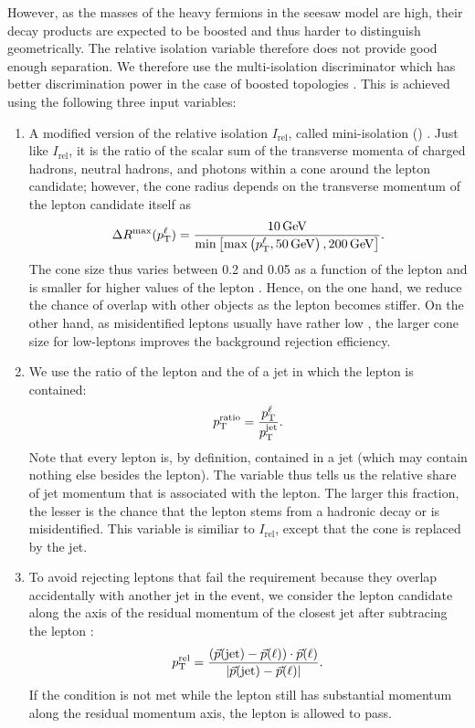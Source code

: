 However, as the masses of the heavy fermions in the seesaw model are high, their decay products are expected to be boosted and thus harder to distinguish geometrically. The relative isolation variable therefore does not provide good enough separation. We therefore use the multi-isolation discriminator which has better discrimination power in the case of boosted topologies \cite{CMS-PAS-SUS-15-008}. This is achieved using the following three input variables:

\begin{enumerate}
	\item A modified version of the relative isolation $I_\textrm{rel}$, called mini-isolation (\miniIso) \cite{Rehermann:2010vq}. Just like $I_\textrm{rel}$, it is the ratio of the scalar sum of the transverse momenta of charged hadrons, neutral hadrons, and photons within a cone around the lepton candidate; however, the cone radius depends on the transverse momentum of the lepton candidate itself as
		\begin{equation}
			\Delta R^\textrm{max}(p_{\mathrm{T}}^\ell) = \dfrac{10\,\text{Ge\hspace{-.08em}V}}{\min\left[\max\left(p_{\mathrm{T}}^\ell, 50\,\text{Ge\hspace{-.08em}V}\right), 200\,\text{Ge\hspace{-.08em}V}\right]}.
		\end{equation}
		The cone size thus varies between 0.2 and 0.05 as a function of the lepton \pt and is smaller for higher values of the lepton \pt. Hence, on the one hand, we reduce the chance of overlap with other objects as the lepton becomes stiffer. On the other hand, as misidentified leptons usually have rather low \pt, the larger cone size for low-\pt leptons improves the background rejection efficiency.
		
	\item We use the ratio of the lepton \pt and the \pt of a jet in which the lepton is contained:
		\begin{equation}
			p_{\mathrm{T}}^\text{ratio} = \dfrac{p_{\mathrm{T}}^\ell}{p_{\mathrm{T}}^\text{jet}}.
		\end{equation}
		Note that every lepton is, by definition, contained in a jet (which may contain nothing else besides the lepton). The \ptRatio variable thus tells us the relative share of jet momentum that is associated with the lepton. The larger this fraction, the lesser is the chance that the lepton stems from a hadronic decay or is misidentified. This variable is similiar to $I_\textrm{rel}$, except that the cone is replaced by the jet.
		
	\item To avoid rejecting leptons that fail the \ptRatio requirement because they overlap accidentally with another jet in the event, we consider the lepton candidate \pt along the axis of the residual momentum of the closest jet after subtracing the lepton \pt:
		\begin{equation}
			p_{\mathrm{T}}^\text{rel}=\frac{(\vec{p}(\text{jet})-\vec{p}(\ell))\cdot \vec{p}(\ell) }{|\vec{p}(\text{jet})-\vec{p}(\ell)|}.
		\end{equation}
		If the \ptRatio condition is not met while the lepton still has substantial momentum along the residual momentum axis, the lepton is allowed to pass.
\end{enumerate}
